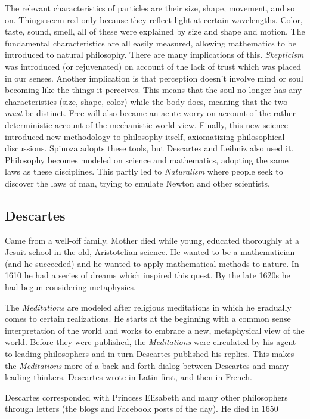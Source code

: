 The relevant characteristics of particles are their size, shape, movement, and so on. Things seem red only because they reflect light at certain wavelengths. Color, taste, sound, smell, all of these were explained by size and shape and motion. The fundamental characteristics are all easily measured, allowing mathematics to be introduced to natural philosophy. There are many implications of this. \emph{Skepticism} was introduced (or rejuvenated) on account of the lack of trust which was placed in our senses. Another implication is that perception doesn't involve mind or soul becoming like the things it perceives. This means that the soul no longer has any characteristics (size, shape, color) while the body does, meaning that the two \emph{must} be distinct. Free will also became an acute worry on account of the rather deterministic account of the mechanistic world-view. Finally, this new science introduced new methodology to philosophy itself, axiomatizing philosophical discussions. Spinoza adopts these tools, but Descartes and Leibniz also used it. Philosophy becomes modeled on science and mathematics, adopting the same laws as these disciplines. This partly led to \emph{Naturalism} where people seek to discover the laws of man, trying to emulate Newton and other scientists.

\subsection{Descartes}

Came from a well-off family. Mother died while young, educated thoroughly at a Jesuit school in the old, Aristotelian science. He wanted to be a mathematician (and he succeeded) and he wanted to apply mathematical methods to nature. In 1610 he had a series of dreams which inspired this quest. By the late 1620s he had begun considering metaphysics.

The \emph{Meditations} are modeled after religious meditations in which he gradually comes to certain realizations. He starts at the beginning with a common sense interpretation of the world and works to embrace a new, metaphysical view of the world. Before they were published, the \emph{Meditations} were circulated by his agent to leading philosophers and in turn Descartes published his replies. This makes the \emph{Meditations} more of a back-and-forth dialog between Descartes and many leading thinkers. Descartes wrote in Latin first, and then in French.

Descartes corresponded with Princess Elisabeth and many other philosophers through letters (the blogs and Facebook posts of the day). He died in 1650 

